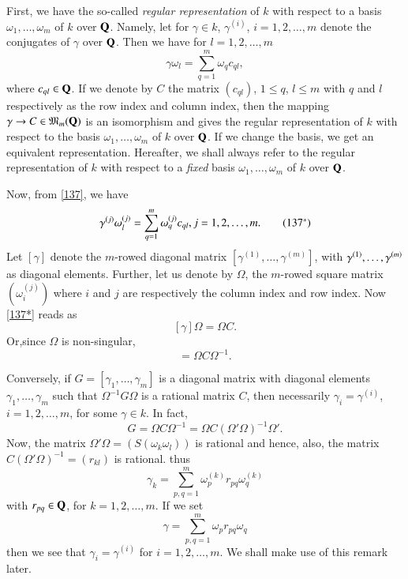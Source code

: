 First, we have the so-called {\em regular representation} of $k$ with
respect to a basis $\omega_{1},\ldots,\omega_{m}$ of $k$ over
$\mathbf{Q}$. Namely, let for $\gamma\in k$, $\gamma^{(i)}$, $i=1,2,\ldots,m$
denote the conjugates of $\gamma$ over $\mathbf{Q}$. Then we have for
$l=1,2,\ldots,m$ 
\begin{equation*}
\gamma\omega_{l}=\sum^{m}_{q=1}\omega_{q}c_{ql},\tag{137}\label{137}
\end{equation*}
where $c_{ql}\in\mathbf{Q}$. If we denote by $C$ the matrix $(c_{ql})$,
$1\leq q$, $l\leq m$ with $q$ and $l$ respectively as the row index
and column index, then the mapping $\gamma\to C\in
\mathfrak{M}_{m}(\mathbf{Q})$ is an isomorphism and gives the regular
representation of $k$ with respect to the basis
$\omega_{1},\ldots,\omega_{m}$ of $k$ over $\mathbf{Q}$. If we change the
basis, we get an equivalent representation. Hereafter, we shall always
refer to the regular representation of $k$ with respect to a {\em
  fixed} basis $\omega_{1},\ldots,\omega_{m}$ of $k$ over $\mathbf{Q}$.

Now, from \eqref{137}, we have
\begin{equation*}
\gamma^{(j)}\omega^{(j)}_{l} =
\sum^{m}_{q=1}\omega^{(j)}_{q}c_{ql},j=1,2,\ldots,m.\tag{$137^{\ast}$}\label{137*} 
\end{equation*}
Let $[\gamma]$ denote the $m$-rowed diagonal matrix
$[\gamma^{(1)},\ldots,\gamma^{(m)}]$, with
$\gamma^{(1)},\break\ldots,\gamma^{(m)}$ as diagonal elements. Further, let
us denote by $\Omega$, the $m$-rowed square matrix
$(\omega^{(j)}_{i})$ where $i$ and $j$ are respectively the column
index and row index. Now \eqref{137*} reads as
$$
[\gamma]\Omega=\Omega C.
$$
Or,\pageoriginale since $\Omega$ is non-singular,
\begin{equation*}
[\gamma]=\Omega C \Omega^{-1}.\tag{138}\label{138}
\end{equation*}

Conversely, if $G=[\gamma_{1},\ldots,\gamma_{m}]$ is a diagonal matrix
with diagonal elements $\gamma_{1},\ldots,\gamma_{m}$ such that
$\Omega^{-1}G\Omega$ is a rational matrix $C$, then necessarily
$\gamma_{i}=\gamma^{(i)}$, $i=1,2,\ldots,m$, for some $\gamma\in
k$. In fact, 
$$
G=\Omega C\Omega^{-1}=\Omega C(\Omega'\Omega)^{-1}\Omega'.
$$
Now, the matrix $\Omega'\Omega=(S(\omega_{k}\omega_{l}))$ is rational
and hence, also, the matrix $C(\Omega'\Omega)^{-1}=(r_{kl})$ is
rational. thus
$$
\gamma_{k}=\sum^{m}_{p,q=1}\omega^{(k)}_{p}r_{pq}\omega^{(k)}_{q}
$$
with $r_{pq}\in\mathbf{Q}$, for $k=1,2,\ldots,m$. If we set
$$
\gamma=\sum^{m}_{p,q=1}\omega_{p}r_{pq}\omega_{q}
$$
then we see that $\gamma_{i}=\gamma^{(i)}$ for $i=1,2,\ldots,m$. We
shall make use of this remark later.

